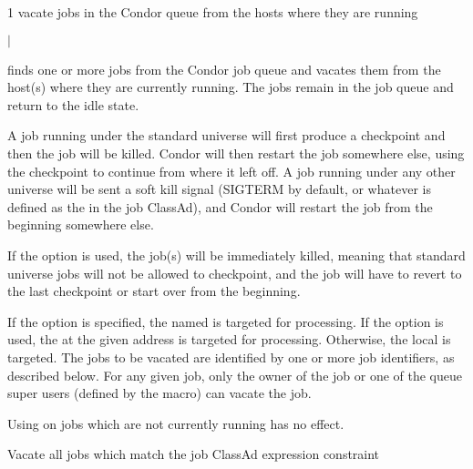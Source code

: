 \begin{ManPage}{\label{man-condor-vacate-job}}{1}
{vacate jobs in the Condor queue from the hosts where they are running}
\Synopsis {}
\ToolArgsBase

\ToolLocate
{}
\ToolJobs
$|$  \Dots

\ToolLocate
{}
\ToolAll


\Description

 finds one or more jobs from the Condor job queue
and vacates them from the host(s) where they are currently running.  
The jobs remain in the job queue and return to the idle state.

A job running under the standard universe will first produce a
checkpoint and then the job will be killed.
Condor will then restart the job somewhere else, using the checkpoint
to continue from where it left off.
A job running under any other universe will be sent a soft kill signal
(SIGTERM by default, or whatever is defined as the 
in the job ClassAd), and Condor will restart the job from the
beginning somewhere else. 

If the  option is used, the job(s) will be immediately killed,
meaning that standard universe jobs will not be allowed to checkpoint,
and the job will have to revert to the last checkpoint or start over
from the beginning.

If the  option is specified, the named  is
targeted for processing.  
If the  option is used, the  at the given
address is targeted for processing.  
Otherwise, the local  is targeted.
The jobs to be vacated are identified by one or more job identifiers, as
described below.
For any given job, only the owner of the job or one of the queue super users
(defined by the  macro) can vacate the job.

Using  on jobs which are not currently running has
no effect.

\begin{Options}
	\ToolArgsBaseDesc
	\ToolLocateDesc
	 {Vacate all jobs which match
	                the job ClassAd expression constraint}
\end{Options}


\end{ManPage}
